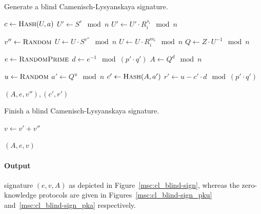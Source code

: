 \begin{algorithm}[t]
  \caption{Generate a blind Camenisch-Lysyanskaya signature.}
  \label{alg:CL-blind-sign}
  \addtolength{\baselineskip}{1mm}
  \begin{algorithmic}[1]

      \State $c \gets \Call{Hash}{U, a}$
      \State $U' \gets S^r \mod n$
        \State $U' \gets U' \cdot R_i^{s_i} \mod n$
      \EndFor
        \Return {}
      \EndIf

      \State $v'' \gets \Call{Random}{}$
      \State $U \gets U \cdot S^{v''} \mod n$
        \State $U \gets U \cdot R_i^{m_i} \mod n$
      \EndFor
      \State $Q \gets Z \cdot U^{-1} \mod n$

      \State $e \gets \Call{RandomPrime}{}$
      \State $d \gets e^{-1} \mod (p' \cdot q')$
      \State $A \gets Q^d \mod n$

      \State $u \gets \Call{Random}{}$
      \State $a' \gets Q^u \mod n$
      \State $c' \gets \Call{Hash}{A, a'}$
      \State $r' \gets u - c' \cdot d \mod (p' \cdot q')$

      \Return $(A, e, v''), (c', r')$
    \EndFunction
  \end{algorithmic}
\end{algorithm}

\begin{algorithm}[t]
  \caption{Finish a blind Camenisch-Lysyanskaya signature.}
  \label{alg:CL-blind-finish}
  \addtolength{\baselineskip}{1mm}
  \begin{algorithmic}[1]

      \If{}
      \EndIf

      \State $v \gets v' + v''$

      \Return $(A, e, v)$
    \EndFunction
  \end{algorithmic}
\end{algorithm}

\paragraph{Output} signature $(e, v, A)$ as depicted in Figure~\ref{msc:cl_blind-sign}, whereas the zero-knowledge protocols are given in Figures~\ref{msc:cl_blind-sign_pku} and~\ref{msc:cl_blind-sign_pka} respectively.

